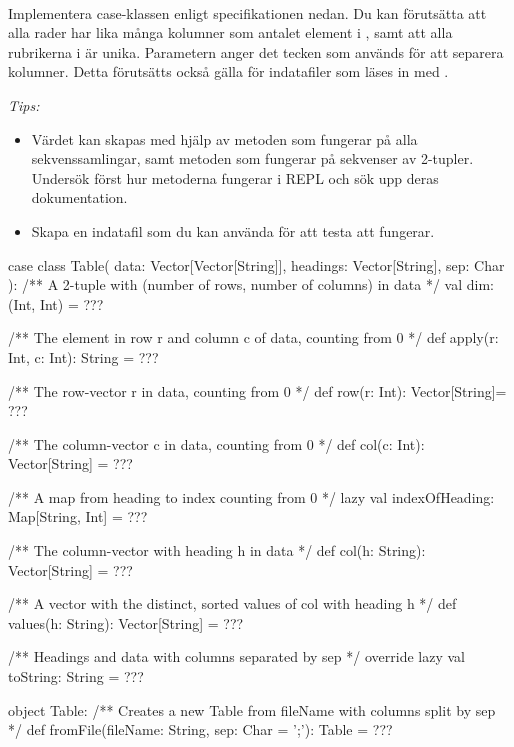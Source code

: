 
\QUESTBEGIN

\Task  \what~  %

\Subtask Implementera case-klassen  enligt specifikationen nedan. Du kan förutsätta att alla rader har lika många kolumner som antalet element i , samt att alla rubrikerna i  är unika. Parametern  anger det tecken som används för att separera kolumner. Detta förutsätts också gälla för indatafiler som läses in med .

\emph{Tips:}
\begin{itemize}%
\item Värdet  kan skapas med hjälp av metoden  som fungerar på alla sekvenssamlingar, samt metoden  som fungerar på sekvenser av 2-tupler. Undersök först hur metoderna fungerar i REPL och sök upp deras dokumentation.
\item Skapa en indatafil som du kan använda för att testa att  fungerar.
\end{itemize}


\begin{CodeSmall}
case class Table(
  data: Vector[Vector[String]],
  headings: Vector[String],
  sep: Char
):
  /** A 2-tuple with (number of rows, number of columns) in data */
  val dim: (Int, Int) = ???

  /** The element in row r and column c of data, counting from 0 */
  def apply(r: Int, c: Int): String = ???

  /** The row-vector r in data, counting from 0 */
  def row(r: Int): Vector[String]= ???

  /** The column-vector c in data, counting from 0 */
  def col(c: Int): Vector[String] = ???

  /** A map from heading to index counting from 0 */
  lazy val indexOfHeading: Map[String, Int] = ???

  /** The column-vector with heading h in data */
  def col(h: String): Vector[String] = ???

  /** A vector with the distinct, sorted values of col with heading h */
  def values(h: String): Vector[String] = ???

  /** Headings and data with columns separated by sep */
  override lazy val toString: String = ???

object Table:
  /** Creates a new Table from fileName with columns split by sep */
  def fromFile(fileName: String, sep: Char = ';'): Table = ???
\end{CodeSmall}

